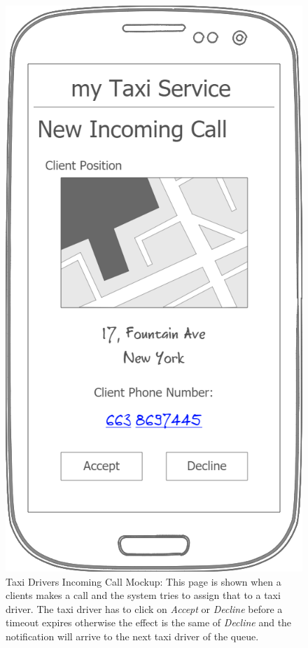 \documentclass[a4paper]{article}
\begin{document}
\begin{figure}[H]
\includegraphics[width=\mockupWidth]{Mockup-TaxiDriversNewIncomingCall}
\centering
\caption[Taxi Drivers Incoming Call Mockup]{Taxi Drivers Incoming Call Mockup: \newline This page is shown when a clients makes a call and the system tries to assign that to a taxi driver. The taxi driver has to click on \emph{Accept} or \emph{Decline} before a timeout expires otherwise the effect is the same of \emph{Decline} and the notification will arrive to the next taxi driver of the queue.}
\label{fig:mockuptaxidriverincomingcall}
\end{figure}
\end{document}
